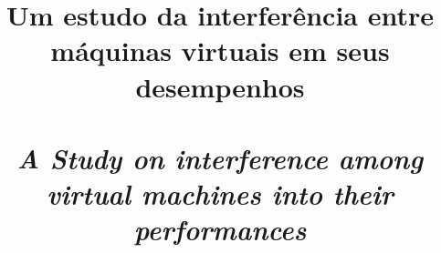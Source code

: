\documentclass[[10pt,journal]{IEEEtran}
\begin{document}
\title{Um estudo da interferência entre máquinas virtuais em seus desempenhos \\~\\
\textit{A Study on interference among virtual machines into their performances}}


\maketitle










\end{document}
